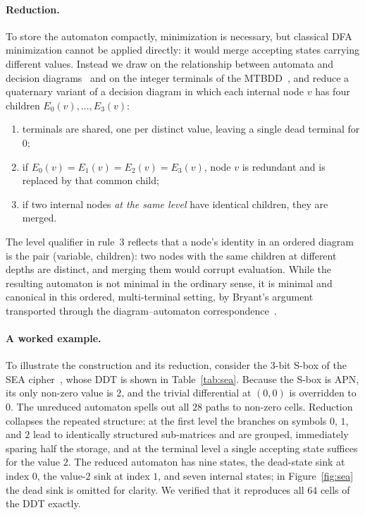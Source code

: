 \documentclass[runningheads]{llncs}
\begin{document}
\paragraph{Reduction.}
To store the automaton compactly, minimization is necessary, but classical DFA
minimization cannot be applied directly: it would merge accepting states carrying
different values. Instead we draw on the relationship between automata and
decision diagrams~\cite{kimura} and on the integer terminals of the
MTBDD~\cite{mtbdd}, and reduce a quaternary variant of a decision diagram in which
each internal node $v$ has four children $E_0(v),\dots,E_3(v)$:
\begin{enumerate}
  \item terminals are shared, one per distinct value, leaving a single dead
        terminal for $0$;
  \item if $E_0(v)=E_1(v)=E_2(v)=E_3(v)$, node $v$ is redundant and is replaced by
        that common child;
  \item if two internal nodes \emph{at the same level} have identical children,
        they are merged.
\end{enumerate}
The level qualifier in rule~3 reflects that a node's identity in an ordered diagram
is the pair (variable, children): two nodes with the same children at different
depths are distinct, and merging them would corrupt evaluation. While the
resulting automaton is not minimal in the ordinary sense, it is minimal and
canonical in this ordered, multi-terminal setting, by Bryant's
argument~\cite{bryant} transported through the diagram--automaton
correspondence~\cite{kimura}.

\paragraph{A worked example.}
To illustrate the construction and its reduction, consider the $3$-bit S-box of
the SEA cipher~\cite{sea}, whose DDT is shown in Table~\ref{tab:sea}. Because the S-box is
APN, its only non-zero value is $2$, and the trivial differential at $(0,0)$ is
overridden to $0$. The unreduced automaton spells out all $28$ paths to non-zero
cells. Reduction collapses the repeated structure: at the first level the
branches on symbols $0$, $1$, and $2$ lead to identically structured
sub-matrices and are grouped, immediately sparing half the storage, and at the
terminal level a single accepting state suffices for the value $2$. The reduced
automaton has nine states, the dead-state sink at index $0$, the value-$2$ sink
at index $1$, and seven internal states; in Figure~\ref{fig:sea} the dead sink
is omitted for clarity. We verified that it reproduces all $64$ cells of the DDT
exactly.
\end{document}

